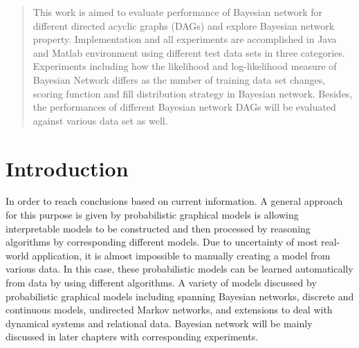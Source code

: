 \documentclass{article}
\begin{document}
 


\begin{abstract} 
This work is aimed to evaluate performance of Bayesian network for different directed acyclic graphs (DAGs) and explore Bayesian network property. Implementation and all experiments are accomplished in Java and Matlab environment using different test data sets in three categories. Experiments including how the likelihood and log-likelihood measure of Bayesian Network differs as the number of training data set changes, scoring function and fill distribution strategy in Bayesian network. Besides, the performances of different Bayesian network DAGs will be evaluated against various data set as well.
\end{abstract} 

\section{Introduction}
\label{submission}

In order to reach conclusions based on current information. A general approach for this purpose is given by probabilistic graphical models is allowing interpretable models to be constructed and then processed by reasoning algorithms by corresponding different models. 
Due to uncertainty of most real-world application, it is almost impossible to manually creating a model from various data. In this case, these probabilistic models can be learned automatically from data by using different algorithms. A variety of models discussed by probabilistic graphical models including spanning Bayesian networks, discrete and continuous models, undirected Markov networks, and extensions to deal with dynamical systems and relational data\cite{prob}. Bayesian network will be mainly discussed in later chapters with corresponding experiments.
\end{document}
